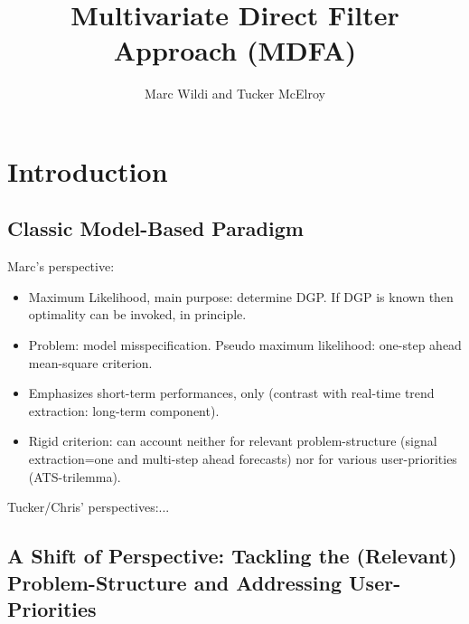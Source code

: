 \documentclass[a4paper]{book}
\title{Multivariate Direct Filter Approach (MDFA)}
\author{Marc Wildi and Tucker McElroy}
\begin{document}
\maketitle

\date{}


\frontmatter%

%
%




\tableofcontents


\mainmatter%



\chapter{Introduction}\label{intro_sec}

\section{Classic Model-Based Paradigm}

Marc's perspective:
\begin{itemize}
\item Maximum Likelihood, main purpose: determine DGP. If DGP is known then optimality can be invoked, in principle. 
\item Problem: model misspecification. Pseudo maximum likelihood: one-step ahead mean-square criterion. 
\item Emphasizes short-term performances, only (contrast with real-time trend extraction: long-term component). 
\item Rigid criterion: can account neither for relevant problem-structure (signal extraction=one and multi-step ahead forecasts) nor for various user-priorities (ATS-trilemma).
\end{itemize}

Tucker/Chris' perspectives:...


\section{A Shift of Perspective: Tackling the (Relevant) Problem-Structure and Addressing User-Priorities}
\end{document}
